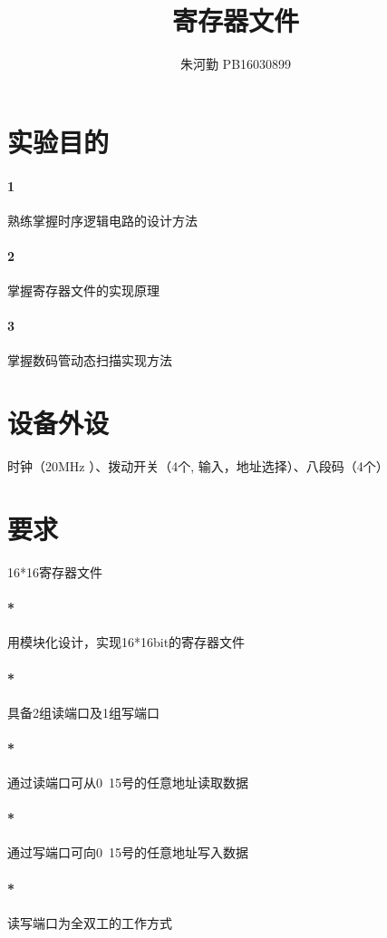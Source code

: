 \documentclass[UTF8]{ctexart}
\title{寄存器文件}
\author{朱河勤   PB16030899}
\begin{document}
\maketitle
\tableofcontents

\section{实验目的}

\paragraph{1}熟练掌握时序逻辑电路的设计方法

\paragraph{2}掌握寄存器文件的实现原理
\paragraph{3}掌握数码管动态扫描实现方法



\section{设备外设}
时钟（20MHz ）、拨动开关（4个, 输入，地址选择）、八段码（4个）

\section{要求}
16*16寄存器文件
\paragraph{*}用模块化设计，实现16*16bit的寄存器文件
\paragraph{*}具备2组读端口及1组写端口
\paragraph{*}通过读端口可从0~15号的任意地址读取数据
\paragraph{*}通过写端口可向0~15号的任意地址写入数据
\paragraph{*}读写端口为全双工的工作方式
\end{document}
